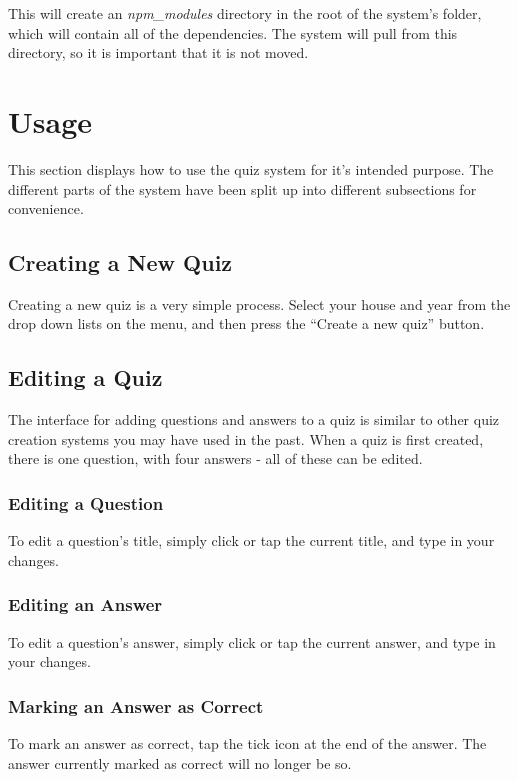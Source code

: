 This will create an \textit{npm\_modules} directory in the root of the system's folder, which will contain all of the dependencies. The system will pull from this directory, so it is important that it is not moved.


\section{Usage} %
\label{sec:usage}
This section displays how to use the quiz system for it's intended purpose. The different parts of the system have been split up into different subsections for convenience.

\subsection{Creating a New Quiz} %
\label{sub:creating_a_quiz}
Creating a new quiz is a very simple process. Select your house and year from the drop down lists on the menu, and then press the ``Create a new quiz'' button.

\subsection{Editing a Quiz} %
\label{sub:editing_a_quiz}
The interface for adding questions and answers to a quiz is similar to other quiz creation systems you may have used in the past. When a quiz is first created, there is one question, with four answers - all of these can be edited.

\subsubsection{Editing a Question} %
\label{ssub:editing_a_question}
To edit a question's title, simply click or tap the current title, and type in your changes.

\subsubsection{Editing an Answer} %
\label{ssub:editing_an_answer}
To edit a question's answer, simply click or tap the current answer, and type in your changes.

\subsubsection{Marking an Answer as Correct} %
\label{ssub:marking_an_answer_as_correct}
To mark an answer as correct, tap the tick icon at the end of the answer. The answer currently marked as correct will no longer be so.

